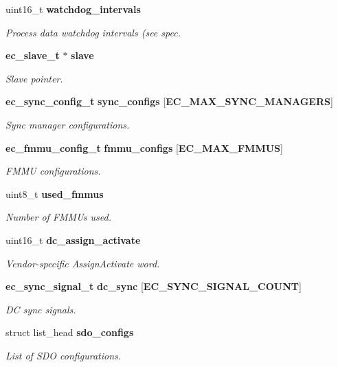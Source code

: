 \begin{DoxyCompactItemize}
uint16\-\_\-t {\bf watchdog\-\_\-intervals}
\begin{DoxyCompactList}\small\item\em Process data watchdog intervals (see spec. \end{DoxyCompactList}\item 
{\bf ec\-\_\-slave\-\_\-t} $\ast$ {\bf slave}
\begin{DoxyCompactList}\small\item\em Slave pointer. \end{DoxyCompactList}\item 
{\bf ec\-\_\-sync\-\_\-config\-\_\-t} {\bf sync\-\_\-configs} [{\bf E\-C\-\_\-\-M\-A\-X\-\_\-\-S\-Y\-N\-C\-\_\-\-M\-A\-N\-A\-G\-E\-R\-S}]
\begin{DoxyCompactList}\small\item\em Sync manager configurations. \end{DoxyCompactList}\item 
{\bf ec\-\_\-fmmu\-\_\-config\-\_\-t} {\bf fmmu\-\_\-configs} [{\bf E\-C\-\_\-\-M\-A\-X\-\_\-\-F\-M\-M\-U\-S}]
\begin{DoxyCompactList}\small\item\em F\-M\-M\-U configurations. \end{DoxyCompactList}\item 
uint8\-\_\-t {\bf used\-\_\-fmmus}
\begin{DoxyCompactList}\small\item\em Number of F\-M\-M\-Us used. \end{DoxyCompactList}\item 
uint16\-\_\-t {\bf dc\-\_\-assign\-\_\-activate}
\begin{DoxyCompactList}\small\item\em Vendor-\/specific Assign\-Activate word. \end{DoxyCompactList}\item 
{\bf ec\-\_\-sync\-\_\-signal\-\_\-t} {\bf dc\-\_\-sync} [{\bf E\-C\-\_\-\-S\-Y\-N\-C\-\_\-\-S\-I\-G\-N\-A\-L\-\_\-\-C\-O\-U\-N\-T}]
\begin{DoxyCompactList}\small\item\em D\-C sync signals. \end{DoxyCompactList}\item 
struct list\-\_\-head {\bf sdo\-\_\-configs}
\begin{DoxyCompactList}\small\item\em List of S\-D\-O configurations. \end{DoxyCompactList}\item 

\end{DoxyCompactItemize}
